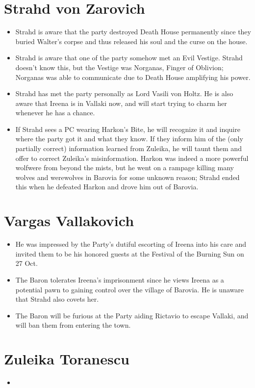 \documentclass[a4paper,11pt]{article}
\begin{document}
\section{Strahd von Zarovich}
\begin{itemize}
  \item Strahd is aware that the party destroyed Death House permanently since they buried Walter's corpse and 
  thus released his soul and the curse on the house.
  \item Strahd is aware that one of the party somehow met an Evil Vestige. Strahd doesn't know this, but the 
  Vestige was Norganas, Finger of Oblivion; Norganas was able to communicate due to Death House amplifying his 
  power.
  \item Strahd has met the party personally as Lord Vasili von Holtz. He is also aware that Ireena is in Vallaki 
  now, and will start trying to charm her whenever he has a chance.
  \item If Strahd sees a PC wearing Harkon's Bite, he will recognize it and inquire where the party got it and what 
  they know. If they inform him of the (only partially correct) information learned from Zuleika, he will taunt 
  them and offer to correct Zuleika's misinformation. Harkon was indeed a more powerful wolfwere from beyond the 
  mists, but he went on a rampage killing many wolves and werewolves in Barovia for some unknown reason; Strahd 
  ended this when he defeated Harkon and drove him out of Barovia.
\end{itemize}

\section{Vargas Vallakovich}
\begin{itemize}
  \item He was impressed by the Party's dutiful escorting of Ireena into his care and invited them to be his
  honored guests at the Festival of the Burning Sun on 27 Oct.
  \item The Baron tolerates Ireena's imprisonment since he views Ireena as a potential pawn to gaining control over 
  the village of Barovia. He is unaware that Strahd also covets her.
  \item The Baron will be furious at the Party aiding Rictavio to escape Vallaki, and will ban them from entering
  the town.
\end{itemize}

\section{Zuleika Toranescu}
\begin{itemize}
  \item
\end{itemize}
\end{document}
